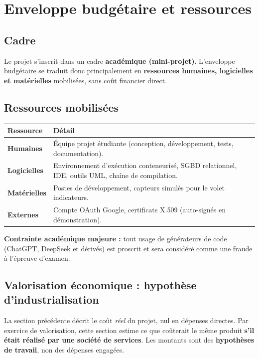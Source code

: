 \chapter{Enveloppe budgétaire et ressources}

\section{Cadre}
Le projet s'inscrit dans un cadre \textbf{académique (mini-projet)}. L'enveloppe
budgétaire se traduit donc principalement en \textbf{ressources humaines,
logicielles et matérielles} mobilisées, sans coût financier direct.

\section{Ressources mobilisées}
\begin{xltabular}{\textwidth}{>{\bfseries}p{4cm} X}
\toprule
\textbf{Ressource} & \textbf{Détail} \\
\midrule
\endhead
Humaines   & Équipe projet étudiante (conception, développement, tests, documentation). \\
Logicielles & Environnement d'exécution conteneurisé, SGBD relationnel, IDE, outils UML, chaîne de compilation. \\
Matérielles & Postes de développement, capteurs simulés pour le volet indicateurs. \\
Externes   & Compte OAuth Google, certificats X.509 (auto-signés en démonstration). \\
\bottomrule
\end{xltabular}

\begin{encadre}
\textbf{Contrainte académique majeure :} tout usage de générateurs de code
(ChatGPT, DeepSeek et dérivés) est proscrit et sera considéré comme une fraude
à l'épreuve d'examen.
\end{encadre}

\section{Valorisation économique : hypothèse d'industrialisation}
La section précédente décrit le coût \emph{réel} du projet, nul en dépenses
directes. Par exercice de valorisation, cette section estime ce que coûterait le
même produit \textbf{s'il était réalisé par une société de services}. Les
montants sont des \textbf{hypothèses de travail}, non des dépenses engagées.

